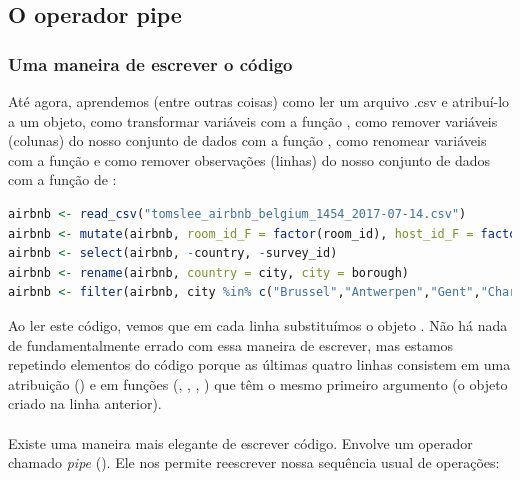 \documentclass{article}
\begin{document}
\subsection{O operador pipe}

\vspace{.25cm}
\subsubsection{Uma maneira de escrever o código}
\vspace{.25cm}

Até agora, aprendemos (entre outras coisas) como ler um arquivo .csv e atribuí-lo a um objeto, como transformar variáveis com a função , como remover variáveis (colunas) do nosso conjunto de dados com a função , como renomear variáveis com a função  e como remover observações (linhas) do nosso conjunto de dados com a função de :

\begin{lstlisting}[language=R]
airbnb <- read_csv("tomslee_airbnb_belgium_1454_2017-07-14.csv")
airbnb <- mutate(airbnb, room_id_F = factor(room_id), host_id_F = factor(host_id), overall_satisfaction_100 = overall_satisfaction * 20)
airbnb <- select(airbnb, -country, -survey_id)
airbnb <- rename(airbnb, country = city, city = borough)
airbnb <- filter(airbnb, city %in% c("Brussel","Antwerpen","Gent","Charleroi","Liege","Brugge","Namur","Leuven","Mons","Aalst")) 
\end{lstlisting}

Ao ler este código, vemos que em cada linha substituímos o objeto . Não há nada de fundamentalmente errado com essa maneira de escrever, mas estamos repetindo elementos do código porque as últimas quatro linhas consistem em uma atribuição () e em funções (, , , ) que têm o mesmo primeiro argumento (o objeto  criado na linha anterior).
\\

\vspace{.5}
\\

\vspace{.25}
Existe uma maneira mais elegante de escrever código. Envolve um operador chamado \textit{pipe} (\fbox{$\%>\%$}). Ele nos permite reescrever nossa sequência usual de operações:
\end{document}
